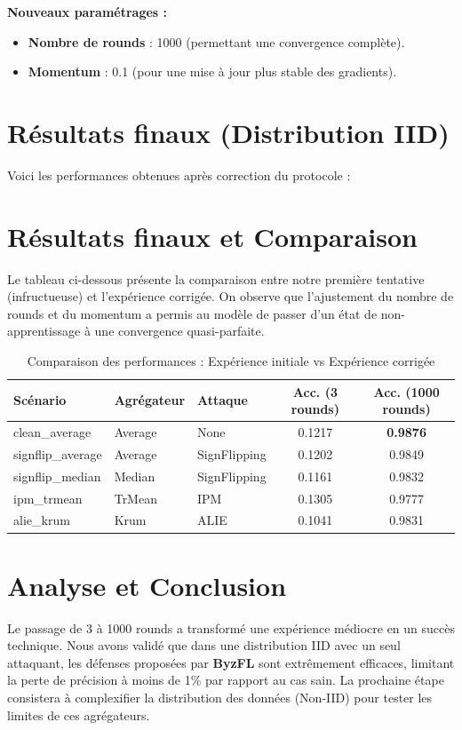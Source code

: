 \documentclass[11pt, a4paper]{article}
\begin{document}
\textbf{Nouveaux paramétrages :}
\begin{itemize}
    \item \textbf{Nombre de rounds} : 1000 (permettant une convergence complète).
    \item \textbf{Momentum} : 0.1 (pour une mise à jour plus stable des gradients).
\end{itemize}

\section{Résultats finaux (Distribution IID)}
Voici les performances obtenues après correction du protocole :

\section{Résultats finaux et Comparaison}
Le tableau ci-dessous présente la comparaison entre notre première tentative (infructueuse) et l'expérience corrigée. On observe que l'ajustement du nombre de rounds et du momentum a permis au modèle de passer d'un état de non-apprentissage à une convergence quasi-parfaite.

\begin{table}[h]
\centering
\begin{tabular}{@{}lllcc@{}}
\toprule
\textbf{Scénario} & \textbf{Agrégateur} & \textbf{Attaque} & \textbf{Acc. (3 rounds)} & \textbf{Acc. (1000 rounds)} \\ \midrule
clean\_average     & Average            & None             & 0.1217                  & \textbf{0.9876}            \\
signflip\_average  & Average            & SignFlipping     & 0.1202                  & 0.9849                     \\
signflip\_median   & Median             & SignFlipping     & 0.1161                  & 0.9832                     \\
ipm\_trmean        & TrMean             & IPM              & 0.1305                  & 0.9777                     \\
alie\_krum         & Krum               & ALIE             & 0.1041                  & 0.9831                     \\ \bottomrule
\end{tabular}
\caption{Comparaison des performances : Expérience initiale vs Expérience corrigée}
\end{table}

\section{Analyse et Conclusion}
Le passage de 3 à 1000 rounds a transformé une expérience médiocre en un succès technique. Nous avons validé que dans une distribution IID avec un seul attaquant, les défenses proposées par \textbf{ByzFL} sont extrêmement efficaces, limitant la perte de précision à moins de 1\% par rapport au cas sain. La prochaine étape consistera à complexifier la distribution des données (Non-IID) pour tester les limites de ces agrégateurs.
\end{document}
